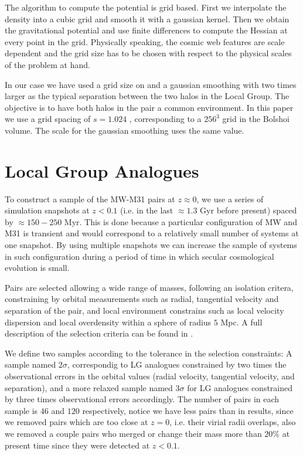 \documentclass{emulateapj}
\newcommand{\mpc}{\rm{Mpc}}
\newcommand{\hMpc}{{\ifmmode{h^{-1}{\rm Mpc}}\else{$h^{-1}$Mpc }\fi}}
\begin{document}
The algorithm to compute the potential is grid based. First we
interpolate the density into a cubic grid and smooth it with a
gaussian kernel. Then we obtain the gravitational potential and use
finite differences to compute the Hessian at every point in the
grid. Physically speaking, the cosmic web features are scale
dependent and the grid size has to be chosen with respect to the
physical scales of the problem at hand.

In our case we have used a grid size on and a gaussian smoothing with
two times larger as the typical separation between the two
halos in the Local Group. The objective is to have both halos in the
pair a common environment. In this paper we use a grid spacing of
$s=1.024$ \hMpc, corresponding to a $256^3$ grid in the Bolshoi
volume. The scale for the gaussian smoothing uses the same value.


\section{Local Group Analogues}

To construct a sample of the MW-M31 pairs at $z\approx 0$, we use a
series of simulation snapshots  at $z<0.1$ (i.e. in the last $\approx
1.3$ Gyr before present) spaced by $\approx 150-250$ Myr. This is done
because a particular configuration of MW and M31 is transient and
would correspond to a relatively small number of systems at one
snapshot. By using multiple snapshots we can increase the sample of
systems in such configuration during a period of time in which secular
cosmological evolution is small. 

Pairs are selected allowing a wide range of masses, following an
isolation critera, constraining by orbital measurements such as
radial, tangential velocity and separation of the pair, and local
environment constrains such as local velocity dispersion and local
overdensity within a sphere of radius $5$ \mpc. A full description of
the selection criteria can be found in \citet{lganalogues,sat}. 

We define two samples according to the tolerance in the selection constraints:
A sample named $2\sigma$, correspondig to LG analogues constrained by
two times the observational errors in the orbital values (radial
velocity, tangential velocity, and separation), and a more relaxed
sample named $3\sigma$ for LG analogues constrained by three times
observational errors accordingly. The number of pairs in each sample
is $46$ and $120$ respectively, notice we have less pairs than in
\citet{lganalogues} results, since we removed pairs which are too
close at $z=0$, i.e. their virial radii overlaps, also we removed a
couple pairs who merged or change their mass more than $20\%$ at
present time since they were detected at $z<0.1$. 
\end{document}
